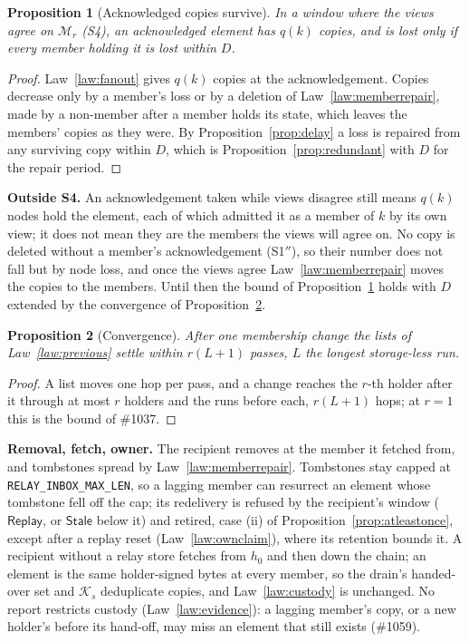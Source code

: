 \documentclass[journal]{IEEEtran}
\newtheorem{proposition}{Proposition}
\newcommand{\K}{\mathcal{K}}
\newcommand{\issue}[1]{\#{#1}}
\newcommand{\Mem}{\mathcal{M}}
\begin{document}
\begin{proposition}[Acknowledged copies survive]\label{prop:copies}
In a window where the views agree on $\Mem_r$ (S4), an acknowledged element has $q(k)$ copies,
and is lost only if every member holding it is lost within $D$.
\end{proposition}
\begin{proof}
Law~\ref{law:fanout} gives $q(k)$ copies at the acknowledgement.  Copies decrease only by a
member's loss or by a deletion of Law~\ref{law:memberrepair}, made by a non-member after a
member holds its state, which leaves the members' copies as they were.  By
Proposition~\ref{prop:delay} a loss is repaired from any surviving copy within $D$, which is
Proposition~\ref{prop:redundant} with $D$ for the repair period.
\end{proof}

\textbf{Outside S4.}  An acknowledgement taken while views disagree still means $q(k)$ nodes
hold the element, each of which admitted it as a member of $k$ by its own view; it does not
mean they are the members the views will agree on.  No copy is deleted without a member's
acknowledgement (S1$''$), so their number does not fall but by node loss, and once the views
agree Law~\ref{law:memberrepair} moves the copies to the members.  Until then the bound of
Proposition~\ref{prop:copies} holds with $D$ extended by the convergence of
Proposition~\ref{prop:converge}.

\begin{proposition}[Convergence]\label{prop:converge}
After one membership change the lists of Law~\ref{law:previous} settle within $r(L+1)$
passes, $L$ the longest storage-less run.
\end{proposition}
\begin{proof}
A list moves one hop per pass, and a change reaches the $r$-th holder after it through at
most $r$ holders and the runs before each, $r(L+1)$ hops; at $r=1$ this is the bound of
\issue{1037}.
\end{proof}

\textbf{Removal, fetch, owner.}  The recipient removes at the member it fetched from, and
tombstones spread by Law~\ref{law:memberrepair}.  Tombstones stay capped at
\texttt{RELAY\_INBOX\_MAX\_LEN}, so a lagging member can resurrect an element whose tombstone
fell off the cap; its redelivery is refused by the recipient's window ($\mathsf{Replay}$, or
$\mathsf{Stale}$ below it) and retired, case (ii) of Proposition~\ref{prop:atleastonce}, except
after a replay reset (Law~\ref{law:ownclaim}), where its retention bounds it.  A recipient
without a relay store fetches from $h_0$ and then down the chain; an element is the same
holder-signed bytes at every member, so the drain's handed-over set and $\K_s$ deduplicate
copies, and Law~\ref{law:custody} is unchanged.  No report restricts custody
(Law~\ref{law:evidence}): a lagging member's copy, or a new holder's before its hand-off, may
miss an element that still exists (\issue{1059}).
\end{document}
